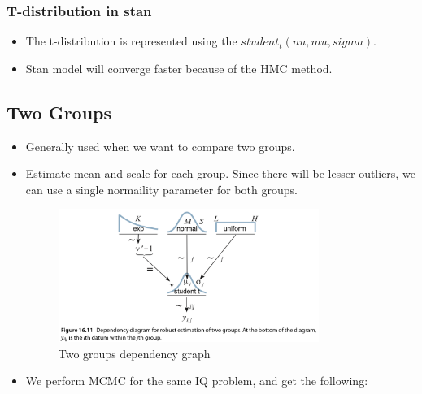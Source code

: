 \documentclass[a4paper]{article}
\begin{document}
\begin{itemize}
\subsubsection{T-distribution in stan}
\begin{itemize}
    \item The t-distribution is represented using the $student_t(nu, mu, sigma)$.
     \item Stan model will converge faster because of the HMC method.
\end{itemize}

\subsection{Two Groups}
\begin{itemize}
    \item Generally used when we want to compare two groups.
    \item Estimate mean and scale for each group. Since there will be lesser outliers, we can use a single normaility parameter for both groups.
    \begin{figure}[H]
        \centering
        \includegraphics[width=0.8\textwidth]{two_groups_graph}
        \caption{Two groups dependency graph}
        \label{fig:two_groups_graph}
    \end{figure}
    \item We perform MCMC for the same IQ problem, and get the following:
    \begin{figure}[H]
        \centering

\end{figure}
\end{itemize}
\end{itemize}
\end{document}
